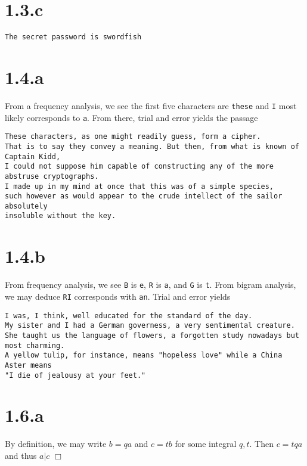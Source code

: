 \documentclass{article}
\newenvironment{myindentpar}[1]
  {\begin{list}{}
          {\setlength{\leftmargin}{#1}}
          \item[]
  }
  {\end{list}}
\begin{document}
\section*{1.3.c}
\verb|The secret password is swordfish|

\section*{1.4.a}
From a frequency analysis, we see the first five characters are \verb|these| and \verb|I| most likely corresponds to \verb|a|. From there, trial and error yields the passage
\begin{myindentpar}{1em}
\verb|These characters, as one might readily guess, form a cipher.|\\
\verb|That is to say they convey a meaning. But then, from what is known of Captain Kidd,|\\
\verb|I could not suppose him capable of constructing any of the more abstruse cryptographs.|\\
\verb|I made up in my mind at once that this was of a simple species,|\\
\verb|such however as would appear to the crude intellect of the sailor absolutely|\\
\verb|insoluble without the key.|
\end{myindentpar}

\section*{1.4.b}
From frequency analysis, we see \verb|B| is \verb|e|, \verb|R| is \verb|a|, and \verb|G| is \verb|t|. From bigram analysis, we may deduce \verb|RI| corresponds with \verb|an|. Trial and error yields
\begin{myindentpar}{1em}
\verb|I was, I think, well educated for the standard of the day.|\\
\verb|My sister and I had a German governess, a very sentimental creature.|\\
\verb|She taught us the language of flowers, a forgotten study nowadays but most charming.|\\
\verb|A yellow tulip, for instance, means "hopeless love" while a China Aster means|\\
\verb|"I die of jealousy at your feet."|
\end{myindentpar}

\section*{1.6.a}
By definition, we may write $b = qa$ and $c = tb$ for some integral $q,t$. Then $c = tqa$ and thus $a|c$ $\Box$
\end{document}
